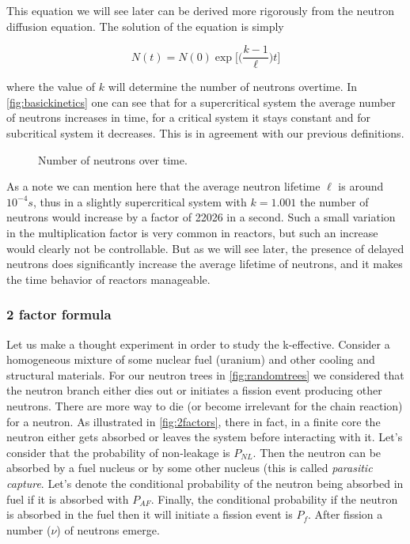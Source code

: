 \noindent This equation we will see later can be derived more rigorously from the neutron diffusion equation. The solution of the equation is simply

\begin{equation}
N(t)=N(0)\exp\Bigg[\Bigg(\frac{k-1}{\ell}\Bigg)t\Bigg]
\end{equation}

\noindent where the value of $k$ will determine the number of neutrons overtime. In \autoref{fig:basickinetics} one can see that for a supercritical system the average number of neutrons increases in time, for a critical system it stays constant and for subcritical system it decreases. This is in agreement with our previous definitions.

\begin{figure}[ht!]
\protect {}\protect
\caption{\label{fig:basickinetics} \footnotesize{Number of neutrons over time.}}
\end{figure}

As a note we can mention here that the average neutron lifetime $\ell$ is around $10^{-4}s$, thus in a slightly supercritical system with $k=1.001$ the number of neutrons would increase by a factor of 22026 in a second. Such a small variation in the multiplication factor is very common in reactors, but such an increase would clearly not be controllable. But as we will see later, the presence of delayed neutrons does significantly increase the average lifetime of neutrons, and it makes the time behavior of reactors manageable.

\subsubsection*{2 factor formula}

Let us make a thought experiment in order to study the k-effective. Consider a homogeneous mixture of some nuclear fuel (uranium) and other cooling and structural materials. For our neutron trees in \autoref{fig:randomtrees} we considered that the neutron branch either dies out or initiates a fission event producing other neutrons. There are more way to die (or become irrelevant for the chain reaction) for a neutron. As illustrated in \autoref{fig:2factors}, there in fact, in a finite core the neutron either gets absorbed or leaves the system before interacting with it. Let's consider that the probability of non-leakage is $P_{NL}$. Then the neutron can be absorbed by a fuel nucleus or by some other nucleus (this is called \textit{parasitic capture}. Let's denote the conditional probability of the neutron being absorbed in fuel if it is absorbed with $P_{AF}$. Finally, the conditional probability if the neutron is absorbed in the fuel then it will initiate a fission event is $P_f$. After fission a number ($\nu$) of neutrons emerge.

